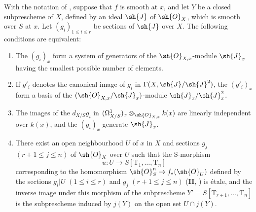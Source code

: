 \begin{corollary}[17.12.2]
\label{IV.17.12.2}
With the notation of , suppose that $f$ is smooth at $x$, and let $Y$ be a closed subprescheme of $X$, defined by an ideal $\sh{J}$ of $\sh{O}_X$, which is smooth over $S$ at $x$.
Let $(g_i)_{1\leq i\leq r}$ be sections of $\sh{J}$ over $X$.
The following conditions are equivalent:
\begin{enumerate}
  \item[a)] The $(g_i)_x$ form a system of generators of the $\sh{O}_{X,x}$-module $\sh{J}_x$ having the smallest possible number of elements.
  \item[b)] If $g'_i$ denotes the canonical image of $g_i$ in $\Gamma(X,\sh{J}/\sh{J}^2)$, the $(g'_i)_x$ form a basis of the $(\sh{O}_{X,x}/\sh{J}_x)$-module $\sh{J}_x/\sh{J}_x^2$.

  \item[c)] The images of the $d_{X/S}g_i$ in
  $(\Omega^1_{X/S})_x\otimes_{\sh{O}_{X,x}}k(x)$ are linearly independent over $k(x)$, and the $(g_i)_x$ generate $\sh{J}_x$.
  \item[d)] There exist an open neighbourhood $U$ of $x$ in $X$ and sections $g_j$ $(r+1\leq j\leq n)$ of $\sh{O}_X$ over $U$ such that the S-morphism
  \[
    u:U\longrightarrow S[\mathrm{T}_1,\ldots,\mathrm{T}_n]
  \]
  corresponding to the homomorphism $\sh{O}^n_S\to f_*(\sh{O}_U)$ defined by the sections $g_i|U$ $(1\leq i\leq r)$ and $g_j$ $(r+1\leq j\leq n)$ (\textbf{II}, ) is \'etale, and the inverse image under this morphism of the subprescheme
  $Y'=S[\mathrm{T}_{r+1},\ldots,\mathrm{T}_n]$
  is the subprescheme induced by $j(Y)$ on the open set $U\cap j(Y)$.
\end{enumerate}
\end{corollary}

